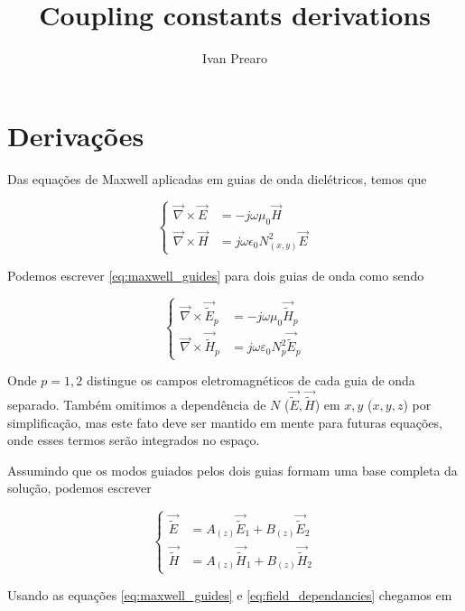 \documentclass[11pt]{article} %
\title{Coupling constants derivations}
\author{Ivan Prearo}
\newcommand{\diverg}{\vec{\nabla}}
\newcommand{\tildee}{ \vec{\tilde{E}}}
\newcommand{\tildeh}{ \vec{\tilde{H}}}
\newcommand{\epsz}{\varepsilon_0}
\newcommand{\muz}{\mu_0}
\begin{document}
\maketitle

\section{Derivações}

Das equações de Maxwell aplicadas em guias de onda dielétricos, temos que

\begin{equation}\label{eq:maxwell_guides}
\left\{
\begin{split}
\diverg \times \vec{E} &= -j\omega\mu_0\vec{H} \\
\diverg\times \vec{H} &= j\omega\epsilon_0N_{(x,y)}^2\vec{E}
\end{split}\right.
\end{equation}

Podemos escrever \ref{eq:maxwell_guides} para dois guias de onda como sendo

\begin{equation}\label{eq:maxwell_pguides}
\left\{
\begin{split}
\diverg \times \tildee_p &= -j\omega\muz\tildeh_p \\
\diverg\times \tildeh_p &= j\omega\epsz N_p^2\tildee_p
\end{split}\right.
\end{equation}

Onde $p=1,2$ distingue os campos eletromagnéticos de cada guia de onda separado. Também omitimos a dependência de $N$ ($\tildee,\tildeh$) em $x,y$ ($x,y,z$) por simplificação, mas este fato deve ser mantido em mente para futuras equações, onde esses termos serão integrados no espaço.

Assumindo que os modos guiados pelos dois guias formam uma base completa da solução, podemos escrever

\begin{equation}\label{eq:field_dependancies}
\left\{
\begin{split}
\tildee &= A_{(z)}\tildee_1 + B_{(z)}\tildee_2 \\
\tildeh &= A_{(z)}\tildeh_1 + B_{(z)}\tildeh_2
\end{split}
\right.
\end{equation}

Usando as equações \ref{eq:maxwell_guides} e \ref{eq:field_dependancies} chegamos em
\end{document}
